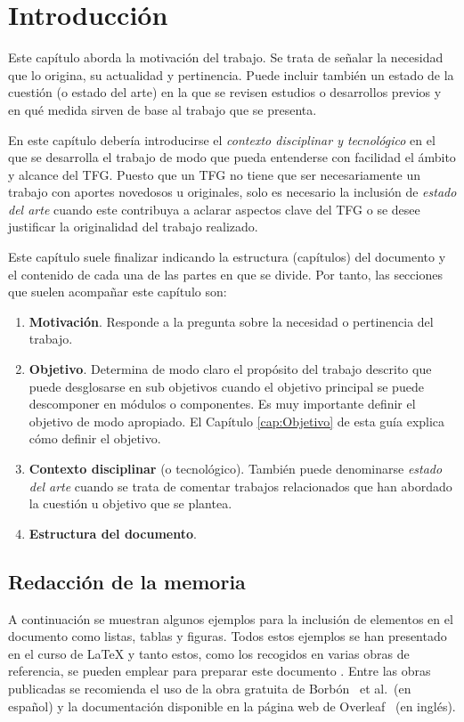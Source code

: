 \chapter{Introducción}
\label{cap:Introduccion}

Este capítulo aborda la motivación del trabajo. Se trata de señalar la necesidad que lo origina, su actualidad y pertinencia. Puede incluir también un estado de la cuestión (o estado del arte) en la que se revisen estudios o desarrollos previos y en qué medida sirven de base al trabajo que se presenta.

En este capítulo debería introducirse el \emph{contexto disciplinar y tecnológico} en el que se desarrolla el trabajo de modo que pueda entenderse con facilidad el ámbito y alcance del TFG. Puesto que un TFG no tiene que ser necesariamente un trabajo con aportes novedosos u originales, solo es necesario la inclusión de \emph{estado del arte} cuando este contribuya a aclarar aspectos clave del TFG o se desee justificar la originalidad del trabajo realizado.

Este capítulo suele finalizar indicando la estructura (capítulos) del documento y el contenido de cada una de las partes en que se divide. Por tanto, las secciones que suelen acompañar este capítulo son:
\begin{enumerate}
    \item \textbf{Motivación}. Responde a la pregunta sobre la necesidad o pertinencia del trabajo.
    \item \textbf{Objetivo}. Determina de modo claro el propósito del trabajo descrito que puede desglosarse en sub objetivos cuando el objetivo principal se puede descomponer en módulos o componentes. Es muy importante definir el objetivo de modo apropiado. El Capítulo \ref{cap:Objetivo} de esta guía explica cómo definir el objetivo.
    \item \textbf{Contexto disciplinar} (o tecnológico). También puede denominarse \emph{estado del arte} cuando se trata de comentar trabajos relacionados que han abordado la cuestión u objetivo que se plantea.
    \item \textbf{Estructura del documento}.
\end{enumerate}


\section{Redacción de la memoria}
A continuación se muestran algunos ejemplos para la inclusión de elementos en el documento como listas, tablas y figuras. Todos estos ejemplos se han presentado en el curso de \LaTeX{} \cite{salido10} y tanto estos, como los recogidos en varias obras de referencia, se pueden emplear para preparar este documento \cite{grat99,grat07,goos04,cascales03,goos07,lamport94,oetiker14,wikibookLaTex10,borbon21}. Entre las obras publicadas se recomienda el uso de la obra gratuita de Borbón~\cite{borbon21} et al.\ (en español) y la documentación disponible en la página web de Overleaf~\cite{overleaf21} (en inglés).


